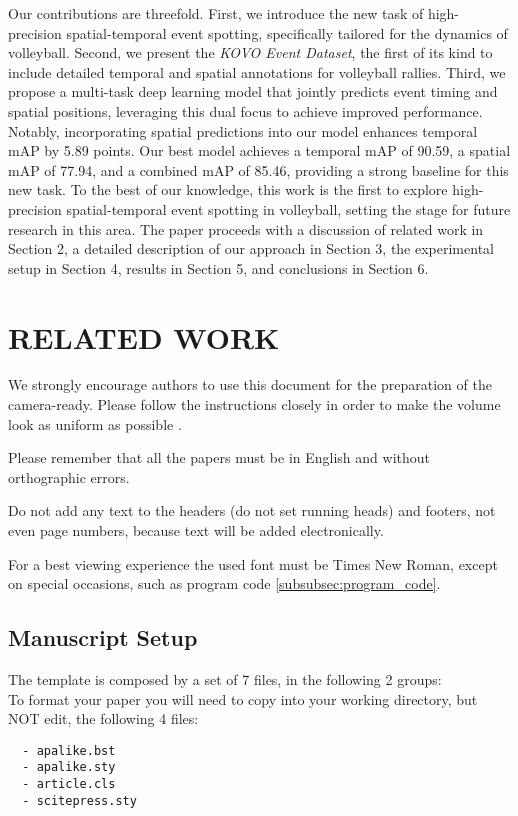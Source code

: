 \documentclass[a4paper,twoside]{article}
\begin{document}
Our contributions are threefold. First, we introduce the new task of high-precision spatial-temporal event spotting, specifically tailored for the dynamics of volleyball. Second, we present the \textit{KOVO Event Dataset}, the first of its kind to include detailed temporal and spatial annotations for volleyball rallies. Third, we propose a multi-task deep learning model that jointly predicts event timing and spatial positions, leveraging this dual focus to achieve improved performance. Notably, incorporating spatial predictions into our model enhances temporal mAP by 5.89 points. Our best model achieves a temporal mAP of 90.59, a spatial mAP of 77.94, and a combined mAP of 85.46, providing a strong baseline for this new task. To the best of our knowledge, this work is the first to explore high-precision spatial-temporal event spotting in volleyball, setting the stage for future research in this area. The paper proceeds with a discussion of related work in Section 2, a detailed description of our approach in Section 3, the experimental setup in Section 4, results in Section 5, and conclusions in Section 6.



\section{\uppercase{Related work}}

We strongly encourage authors to use this document for the
preparation of the camera-ready. Please follow the instructions
closely in order to make the volume look as uniform as possible
\cite{Moore99}.

Please remember that all the papers must be in English and without
orthographic errors.

Do not add any text to the headers (do not set running heads) and
footers, not even page numbers, because text will be added
electronically.

For a best viewing experience the used font must be Times New
Roman, except on special occasions, such as program code
\ref{subsubsec:program_code}.


\subsection{Manuscript Setup}

The template is composed by a set of 7 files, in the
following 2 groups:\\
 To format your paper you will need to copy
into your working directory, but NOT edit, the following 4 files:
\begin{verbatim}
  - apalike.bst
  - apalike.sty
  - article.cls
  - scitepress.sty
\end{verbatim}
\end{document}
